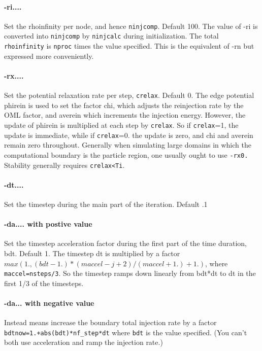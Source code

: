 \documentclass[12pt]{article}
\begin{document}
\paragraph{-ri....} Set the rhoinfinity per node, and hence
\verb!ninjcomp!. Default 100. 
The value of -ri is converted into \verb!ninjcomp! by \verb!ninjcalc! during
initialization. The total \verb!rhoinfinity! is \verb!nproc! times the value
specified. This is the equivalent of -rn but expressed more conveniently.

\paragraph{-rx....} 
Set the potential relaxation rate per step, \verb!crelax!. Default 0.
The edge potential phirein is used to set the factor chi, which
adjusts the reinjection rate by the OML factor, and averein which
increments the injection energy. However, the update of phirein is
multiplied at each step by \verb!crelax!. So if \verb!crelax!=1, the update is
immediate, while if \verb!crelax!=0. the update is zero, and chi and averein
remain zero throughout. Generally when simulating large domains in
which the computational boundary is the particle region, one usually
ought to use \verb!-rx0.! Stability generally requires \verb!crelax<Ti!.

\paragraph{-dt....}
 Set the timestep during the main part of the iteration. Default .1

\paragraph{-da.... with postive value}
 Set the timestep acceleration factor during the first part of
 the time duration, bdt. Default 1. The timestep dt is multiplied by a
 factor $max(1.,(bdt-1.)*(maccel-j+2)/(maccel+1.)+1.)$, where
 \verb!maccel=nsteps/3!.  So the timestep ramps down linearly from bdt*dt to
 dt in the first 1/3 of the timesteps.

\paragraph{-da... with negative value} Instead means increase the
boundary total injection rate by a factor
\verb!bdtnow=1.+abs(bdt)*nf_step*dt! where \verb!bdt! is the value
specified. (You can't both use acceleration and ramp the injection rate.)
\end{document}
